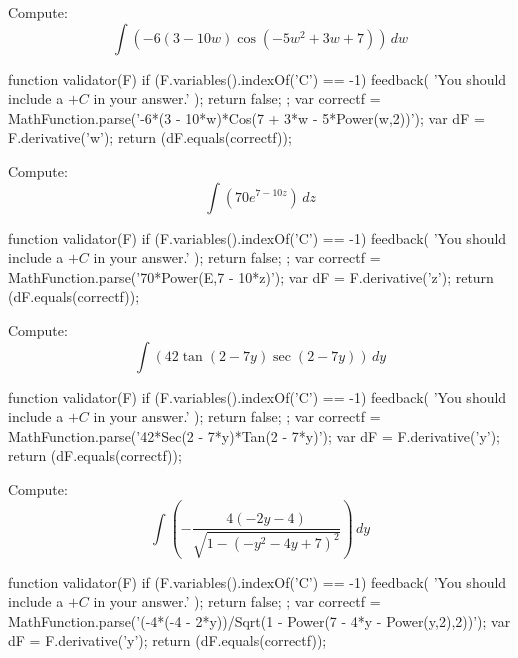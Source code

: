 \documentclass{ximera}
\renewcommand{\d}{\, d}
\begin{document}
\begin{exercise}
Compute: 
\[
\int \left(-6 (3-10 w) \cos \left(-5 w^2+3 w+7\right)\right)\d w
\]
\begin{expressionAnswer}
     function validator(F) {
      if (F.variables().indexOf('C') == -1) {
        feedback( 'You should include a $+C$ in your answer.' );
        return false;
      };      
      var correctf = MathFunction.parse('-6*(3 - 10*w)*Cos(7 + 3*w - 5*Power(w,2))');
      var dF = F.derivative('w');
      return (dF.equals(correctf));
    }
\end{expressionAnswer}
\end{exercise}



\begin{exercise}
Compute: 
\[
\int \left(70 e^{7-10 z}\right)\d z
\]
\begin{expressionAnswer}
     function validator(F) {
      if (F.variables().indexOf('C') == -1) {
        feedback( 'You should include a $+C$ in your answer.' );
        return false;
      };      
      var correctf = MathFunction.parse('70*Power(E,7 - 10*z)');
      var dF = F.derivative('z');
      return (dF.equals(correctf));
    }
\end{expressionAnswer}
\end{exercise}



\begin{exercise}
Compute: 
\[
\int \left(42 \tan (2-7 y) \sec (2-7 y)\right)\d y
\]
\begin{expressionAnswer}
     function validator(F) {
      if (F.variables().indexOf('C') == -1) {
        feedback( 'You should include a $+C$ in your answer.' );
        return false;
      };      
      var correctf = MathFunction.parse('42*Sec(2 - 7*y)*Tan(2 - 7*y)');
      var dF = F.derivative('y');
      return (dF.equals(correctf));
    }
\end{expressionAnswer}
\end{exercise}



\begin{exercise}
Compute: 
\[
\int \left(-\frac{4 (-2 y-4)}{\sqrt{1-\left(-y^2-4 y+7\right)^2}}\right)\d y
\]
\begin{expressionAnswer}
     function validator(F) {
      if (F.variables().indexOf('C') == -1) {
        feedback( 'You should include a $+C$ in your answer.' );
        return false;
      };      
      var correctf = MathFunction.parse('(-4*(-4 - 2*y))/Sqrt(1 - Power(7 - 4*y - Power(y,2),2))');
      var dF = F.derivative('y');
      return (dF.equals(correctf));
    }
\end{expressionAnswer}
\end{exercise}
\end{document}
